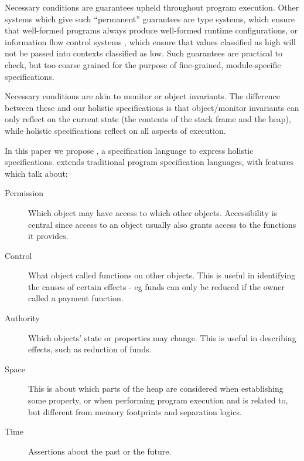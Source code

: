 Necessary conditions are guarantees upheld throughout program execution.
Other systems which give such ``permanent'' guarantees are  type systems, 
which ensure that well-formed programs  always produce well-formed runtime
configurations, or information flow control systems \cite{infoflow}, which ensure that values 
classified as high  will not be passed into contexts classified as low. 
Such  guarantees %
 are  practical to check, but   too coarse grained
for the purpose of fine-grained,  module-specific specifications. 

Necessary conditions are  akin to monitor or object invariants\cite{Hoare74,Meyer97}. The difference between
these and our holistic specifications is that object/monitor invariants can only reflect  on
the current state (\ie the contents of the
stack frame and the heap), while  holistic specifications reflect on all aspects of execution.

In this paper we propose \Chainmail, a specification language to express holistic specifications. \Chainmail extends 
traditional program specification languages\cite{Leavens-etal07,Meyer92}, with features which talk about:

\begin{description}
\item[Permission] Which object may have access to which other objects. 
Accessibility is central since access to an object usually also grants access to the functions it provides.

\item[Control] What object called functions on other objects. This is useful in identifying the causes of certain effects - eg 
funds can only be reduced if the owner called a payment function.

\item[Authority]  Which objects' state or properties may change. This is useful in describing effects, such as reduction of funds.

\item[Space] This is about which parts of the heap are considered when establishing some property, or when 
performing program execution and is
related to, but different from memory footprints and separation logics.

\item[Time] Assertions about the past or the future.
\end{description}

